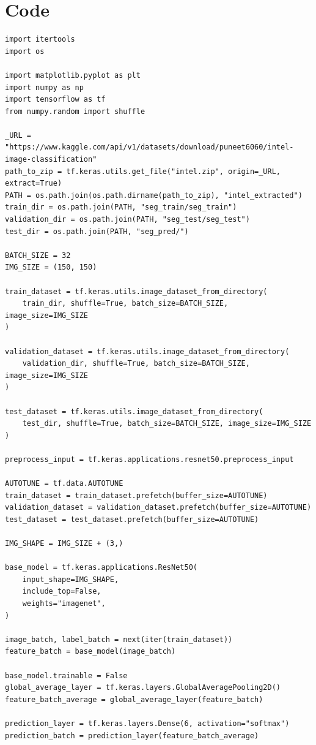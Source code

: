 \documentclass[11pt]{article}
\begin{document}
\pagebreak
\section{Code}
\begin{verbatim}
import itertools
import os

import matplotlib.pyplot as plt
import numpy as np
import tensorflow as tf
from numpy.random import shuffle

_URL = "https://www.kaggle.com/api/v1/datasets/download/puneet6060/intel-image-classification"
path_to_zip = tf.keras.utils.get_file("intel.zip", origin=_URL, extract=True)
PATH = os.path.join(os.path.dirname(path_to_zip), "intel_extracted")
train_dir = os.path.join(PATH, "seg_train/seg_train")
validation_dir = os.path.join(PATH, "seg_test/seg_test")
test_dir = os.path.join(PATH, "seg_pred/")

BATCH_SIZE = 32
IMG_SIZE = (150, 150)

train_dataset = tf.keras.utils.image_dataset_from_directory(
    train_dir, shuffle=True, batch_size=BATCH_SIZE, image_size=IMG_SIZE
)

validation_dataset = tf.keras.utils.image_dataset_from_directory(
    validation_dir, shuffle=True, batch_size=BATCH_SIZE, image_size=IMG_SIZE
)

test_dataset = tf.keras.utils.image_dataset_from_directory(
    test_dir, shuffle=True, batch_size=BATCH_SIZE, image_size=IMG_SIZE
)

preprocess_input = tf.keras.applications.resnet50.preprocess_input

AUTOTUNE = tf.data.AUTOTUNE
train_dataset = train_dataset.prefetch(buffer_size=AUTOTUNE)
validation_dataset = validation_dataset.prefetch(buffer_size=AUTOTUNE)
test_dataset = test_dataset.prefetch(buffer_size=AUTOTUNE)

IMG_SHAPE = IMG_SIZE + (3,)

base_model = tf.keras.applications.ResNet50(
    input_shape=IMG_SHAPE,
    include_top=False,
    weights="imagenet",
)

image_batch, label_batch = next(iter(train_dataset))
feature_batch = base_model(image_batch)

base_model.trainable = False
global_average_layer = tf.keras.layers.GlobalAveragePooling2D()
feature_batch_average = global_average_layer(feature_batch)

prediction_layer = tf.keras.layers.Dense(6, activation="softmax")
prediction_batch = prediction_layer(feature_batch_average)


\end{verbatim}
\end{document}
